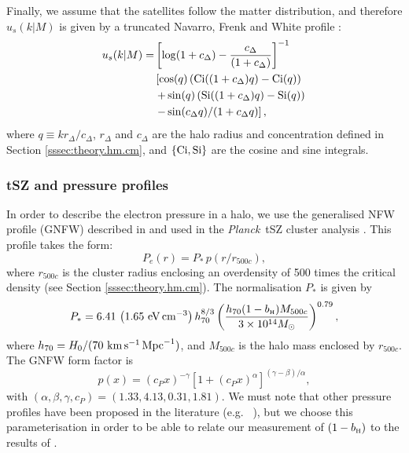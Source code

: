 \documentclass[useAMS,usenatbib]{mn2e}
\def\bH{b_{\scriptscriptstyle\rm H}}
\def\planck{{\it Planck\/}}
\def\citejap#1{\citeauthor{#1}\ \citeyear{#1}}
\begin{document}
      Finally, we assume that the satellites follow the matter distribution, and therefore $u_s(k|M)$ is given by a truncated Navarro, Frenk and White profile \citep{1996ApJ...462..563N}:
      \begin{align}
        u_s(k|M)=&\left[\log(1+c_\Delta)-\frac{c_\Delta}{(1+c_\Delta)}\right]^{-1}\\\nonumber
               &\left[\cos(q)\left({\rm Ci}((1+c_\Delta)q)-{\rm Ci}(q)\right)\right.\\\nonumber
               &\left.+\sin(q)\left({\rm Si}((1+c_\Delta)q)-{\rm Si}(q)\right)\right.\\\nonumber
               &\left.-\sin(c_\Delta q)/(1+c_\Delta q)\right],
      \end{align}
      where $q\equiv kr_\Delta/c_\Delta$, $r_\Delta$ and $c_\Delta$ are the halo radius and concentration defined in Section \ref{sssec:theory.hm.cm}, and $\{{\rm Ci}, {\rm Si}\}$ are the cosine and sine integrals.
      
    \subsubsection{tSZ and pressure profiles}\label{sssec:theory.hm.pe}
      In order to describe the electron pressure in a halo, we use the generalised NFW profile (GNFW) described in \cite{2010A&A...517A..92A} and used in the \planck\ tSZ cluster analysis \citep{2016A&A...594A..24P}. This profile takes the form:
      \begin{equation}
        P_e(r)=P_*\,p(r/r_{500c}),
      \end{equation}
      where $r_{500c}$ is the cluster radius enclosing an overdensity of 500 times the critical density (see Section \ref{sssec:theory.hm.cm}). The normalisation $P_*$ is given by
      \begin{equation}\label{eq:arnaud_norm}
        P_*=6.41\,\left(1.65\,\, {\rm eV}\,{\rm cm}^{-3}\right)h_{70}^{8/3}
        \left(\frac{h_{70}(1-\bH)M_{500c}}{3\times10^{14}M_\odot}\right)^{0.79},
      \end{equation}
      where $h_{70}=H_0/(70\ {\rm km}\,{\rm s}^{-1}\,{\rm Mpc}^{-1})$, and $M_{500c}$ is the halo mass enclosed by $r_{500c}$. The GNFW form factor is
      \begin{equation}
        p(x)=(c_P x)^{-\gamma}\left[1+(c_P x)^\alpha\right]^{(\gamma-\beta)/\alpha},
      \end{equation}
      with $(\alpha,\beta,\gamma,c_P)=(1.33,4.13,0.31,1.81)$. We must note that other pressure profiles have been proposed in the literature (e.g. \citejap{2012ApJ...758...75B}), but we choose this parameterisation in order to be able to relate our measurement of $(1-\bH)$ to the results of \cite{2016A&A...594A..24P}.
      
\end{document}

